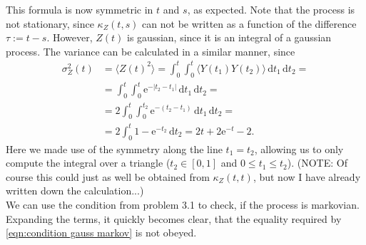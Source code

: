 \documentclass[english, parskip=full]{scrartcl}
\newcommand{\bra}{}
\newcommand{\intx}{}
\newcommand{\e}{\text{e}}
\begin{document}
This formula is now symmetric in $t$ and $s$, as expected.
Note that the process is not stationary, since $\kappa_Z(t,s)$ can not be written as a function of the difference $\tau := t-s$.
However, $Z(t)$ is gaussian, since it is an integral of a gaussian process.
The variance can be calculated in a similar manner, since
\begin{align}
\sigma_Z^2(t) &= \bra\langle Z(t)^2 \rangle = \intx\int_{0}^{t}\intx\int_{0}^{t}\bra\langle Y(t_1)Y(t_2) \rangle\, \mathrm{d}t_1\, \mathrm{d}t_2 = \\
&= \intx\int_{0}^{t}\intx\int_{0}^{t}\e^{-|t_2-t_1|}\, \mathrm{d}t_1\, \mathrm{d}t_2 = \\
&= 2\intx\int_{0}^{t}\intx\int_{0}^{t_2}\e^{-(t_2-t_1)} \, \mathrm{d}t_1\, \mathrm{d}t_2 = \\
&= 2\intx\int_{0}^{t} 1 - \e^{-t_2}\, \mathrm{d}t_2 = 2t + 2\e^{-t} - 2.
\end{align}
Here we made use of the symmetry along the line $t_1=t_2$, allowing us to only compute the integral over a triangle ($t_2\in [0,1]$ and $0\le t_1 \le t_2$).
(NOTE: Of course this could just as well be obtained from $\kappa_Z(t,t)$, but now I have already written down the calculation...)
\\
We can use the condition from problem 3.1 to check, if the process is markovian.
Expanding the terms, it quickly becomes clear, that the equality required by \eqref{eqn:condition gauss markov} is not obeyed.
\end{document}

